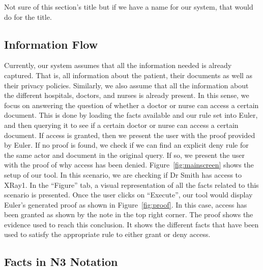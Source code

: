 \documentclass[conference]{IEEEtran}
\begin{document}
Not sure of this section's title but if we have a name for our system, that would do for the title. 

\subsection{Information Flow}
\label{info-flow}

Currently, our system assumes that all the information needed is already captured. That is, all information about the patient, their documents as well as their
privacy policies. Similarly, we also assume that all the information about the different hospitals, doctors, and nurses is already present. In this sense, we
focus on answering the question of whether a doctor or nurse can access a certain document. This is done by loading the facts available and our rule set into
Euler, and then querying it to see if a certain doctor or nurse can access a certain document. If access is granted, then we present the user with the proof
provided by Euler. If no proof is found, we check if we can find an explicit deny rule for the same actor and document in the original query. If so, we present
the user with the proof of why access has been denied. Figure~\ref{fig:mainscreen} shows the setup of our tool. In this scenario, we are checking if Dr Smith
has access to XRay1. In the ``Figure'' tab, a visual representation of all the facts related to this scenario is presented. Once the user clicks on
``Execute'', our tool would display Euler's generated proof as shown in Figure~\ref{fig:proof}. In this case, access has been granted as shown by the note in
the top right corner. The proof shows the evidence used to reach this conclusion. It shows the different facts that have been used to satisfy the appropriate
rule to either grant or deny access.



\subsection{Facts in N3 Notation}
\end{document}
